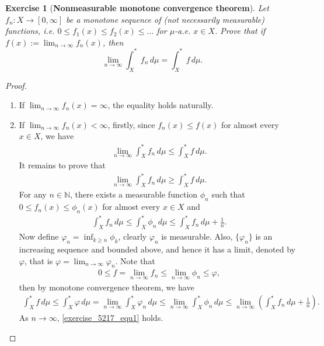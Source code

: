 \documentclass[11pt]{book}
\newtheorem{exercise}{Exercise}[section]
\theoremstyle{definition}
\numberwithin{equation}{chapter}
\begin{document}
\medskip

\begin{exercise}[{\bf Nonmeasurable monotone convergence theorem}]
Let $f_n: X \to [0,\infty]$ be a monotone sequence of (not necessarily measurable) functions, i.e.
$0 \leq f_1(x) \leq f_2(x) \leq \ldots$ for $\mu$-a.e. $x \in X$. Prove that if $f(x):=\lim_{n \to \infty} f_n(x)$, then
\begin{equation}
    \lim_{n\to \infty} \int_X^* f_n \,d\mu = \int_X^* f \, d\mu.
\end{equation}
\end{exercise}
\begin{proof}
~\begin{enumerate}[label=(\alph*)]
    \item If $\lim_{n\to\infty} f_n(x) = \infty$, the equality holds naturally.
    
    \item If $\lim_{n\to\infty} f_n(x) < \infty$, firstly, since $f_n(x) \leq f(x)$ for almost every $x \in X$, we have
    \begin{align*}
        \lim_{n\to \infty} \int_X^* f_n \,d\mu \leq \int_X^* f \,d\mu.
    \end{align*}
    It remains to prove that
    \begin{align}\label{exercise_5217_equ1}
        \lim_{n\to \infty} \int_X^* f_n \,d\mu \geq \int_X^* f \,d\mu.
    \end{align}
    For any $n \in \mathbb{N}$, there exists a measurable function $\phi_n$ such that $0 \leq f_n(x) \leq \phi_n(x)$ for almost every $x \in X$ and 
    \begin{align*}
        \int_X^* f_n \,d\mu \leq \int_X^* \phi_n \,d\mu \leq \int_X^* f_n \,d\mu + \frac{1}{n}.
    \end{align*}
    Now define $\varphi_n = \inf_{k\geq n} \phi_k$, clearly $\varphi_n$ is measurable. Also, $\{\varphi_n\}$ is an increasing sequence and bounded above, and hence it has a limit, denoted by $\varphi$, that is $\varphi = \lim_{n\to\infty} \varphi_n$. Note that
    \begin{align*}
        0 \leq f = \lim_{n\to\infty} f_n \leq \lim_{n\to\infty} \phi_n \leq \varphi,
    \end{align*}
    then by monotone convergence theorem, we have
    \begin{align*}
        \int_X^* f \,d\mu \leq \int_X^* \varphi \,d\mu = \lim_{n\to\infty} \int_X^* \varphi_n \,d\mu \leq \lim_{n\to\infty} \int_X^* \phi_n \,d\mu \leq \lim_{n\to\infty} \left(\int_X^* f_n \,d\mu + \frac{1}{n}\right).
    \end{align*}
    As $n \to \infty$, \eqref{exercise_5217_equ1} holds.
\end{enumerate}
\end{proof}
\end{document}
